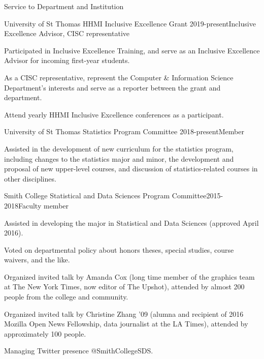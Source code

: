 \documentclass{resume} %
\begin{document}
\begin{rSection}{Service to Department and Institution}
\begin{rSubsection}{University of St Thomas HHMI Inclusive Excellence Grant}{ }{2019-present}{Inclusive Excellence Advisor, CISC representative}
\item Participated in Inclusive Excellence Training, and serve as an Inclusive Excellence Advisor for incoming first-year students.
\item As a CISC representative, represent the Computer \& Information Science Department's interests and serve as a reporter between the grant and department. 
\item Attend yearly HHMI Inclusive Excellence conferences as a participant. 
\end{rSubsection}

\begin{rSubsection}{University of St Thomas Statistics Program Committee}{ }{2018-present}{Member}
\item Assisted in the development of new curriculum for the statistics program, including changes to the statistics major and minor, the development and proposal of new upper-level courses, and discussion of statistics-related courses in other disciplines. 
\end{rSubsection}

\begin{rSubsection}{Smith College Statistical and Data Sciences Program Committee}{}{2015-2018}{Faculty member}
\item Assisted in developing the major in Statistical and Data Sciences (approved April 2016).
\item Voted on departmental policy about honors theses, special studies, course waivers, and the like. 
\item Organized invited talk by Amanda Cox (long time member of the graphics team at The New York Times, now editor of The Upshot), attended by almost 200 people from the college and community. 
\item Organized invited talk by Christine Zhang '09 (alumna and recipient of 2016 Mozilla Open News Fellowship, data journalist at the LA Times), attended by approximately 100 people. 
\item Managing Twitter presence @SmithCollegeSDS. 
\end{rSubsection}




\end{rSection}
\end{document}
